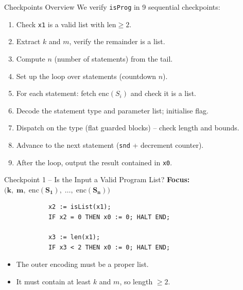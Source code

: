 \documentclass[aspectratio=169]{beamer}
\begin{document}
	\begin{frame}{Checkpoints Overview}
		We verify \texttt{isProg} in 9 sequential checkpoints:
		\begin{enumerate}
			\item Check \texttt{x1} is a valid list with $\mathrm{len}\ge 2$.
			\item Extract $k$ and $m$, verify the remainder is a list.
			\item Compute $n$ (number of statements) from the tail.
			\item Set up the loop over statements (countdown $n$).
			\item For each statement: fetch $\mathrm{enc}(S_i)$ and check it is a list.
			\item Decode the statement type and parameter list; initialise flag.
			\item Dispatch on the type (flat guarded blocks) – check length and bounds.
			\item Advance to the next statement (\texttt{snd} + decrement counter).
			\item After the loop, output the result contained in \texttt{x0}.
		\end{enumerate}
	\end{frame}
	
	\begin{frame}[fragile]{Checkpoint 1 – Is the Input a Valid Program List?}
		\textbf{Focus:} \(\mathbf{\bigl(k,\; m,\; \mathrm{enc}(S_1),\; \ldots,\; \mathrm{enc}(S_n)\bigr)}\)
		\small
		\begin{verbatim}
			x2 := isList(x1);
			IF x2 = 0 THEN x0 := 0; HALT END;
			
			x3 := len(x1);
			IF x3 < 2 THEN x0 := 0; HALT END;
		\end{verbatim}
		\vspace{-4pt}
		\begin{itemize}
			\item The outer encoding must be a proper list.
			\item It must contain at least $k$ and $m$, so length $\ge 2$.
		\end{itemize}
	\end{frame}
	
\end{document}
